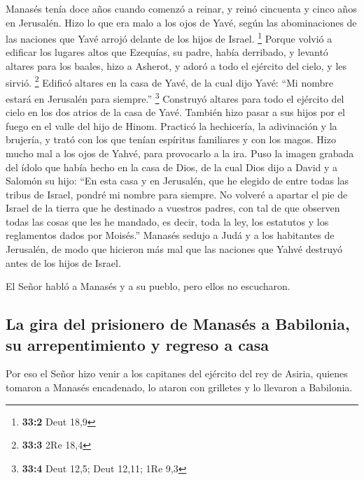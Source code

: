 \begin{paracol}{2}
 Manasés tenía doce años cuando comenzó a reinar, y reinó
cincuenta y cinco años en Jerusalén.  Hizo lo que era malo
a los ojos de Yavé, según las abominaciones de las naciones que Yavé
arrojó delante de los hijos de Israel. \footnote{\textbf{33:2} Deut 18,9}
 Porque volvió a edificar los lugares altos que Ezequías,
su padre, había derribado, y levantó altares para los baales, hizo a
Asherot, y adoró a todo el ejército del cielo, y les sirvió. \footnote{\textbf{33:3}
  2Re 18,4}  Edificó altares en la casa de Yavé, de la
cual dijo Yavé: ``Mi nombre estará en Jerusalén para siempre.''
\footnote{\textbf{33:4} Deut 12,5; Deut 12,11; 1Re 9,3} 
Construyó altares para todo el ejército del cielo en los dos atrios de
la casa de Yavé.  También hizo pasar a sus hijos por el
fuego en el valle del hijo de Hinom. Practicó la hechicería, la
adivinación y la brujería, y trató con los que tenían espíritus
familiares y con los magos. Hizo mucho mal a los ojos de Yahvé, para
provocarlo a la ira.  Puso la imagen grabada del ídolo que
había hecho en la casa de Dios, de la cual Dios dijo a David y a Salomón
su hijo: ``En esta casa y en Jerusalén, que he elegido de entre todas
las tribus de Israel, pondré mi nombre para siempre.  No
volveré a apartar el pie de Israel de la tierra que he destinado a
vuestros padres, con tal de que observen todas las cosas que les he
mandado, es decir, toda la ley, los estatutos y los reglamentos dados
por Moisés.''  Manasés sedujo a Judá y a los habitantes de
Jerusalén, de modo que hicieron más mal que las naciones que Yahvé
destruyó antes de los hijos de Israel.

 El Señor habló a Manasés y a su pueblo, pero ellos no
escucharon.

\hypertarget{la-gira-del-prisionero-de-manasuxe9s-a-babilonia-su-arrepentimiento-y-regreso-a-casa}{%
\subsection{La gira del prisionero de Manasés a Babilonia, su
arrepentimiento y regreso a
casa}\label{la-gira-del-prisionero-de-manasuxe9s-a-babilonia-su-arrepentimiento-y-regreso-a-casa}}

 Por eso el Señor hizo venir a los capitanes del ejército
del rey de Asiria, quienes tomaron a Manasés encadenado, lo ataron con
grilletes y lo llevaron a Babilonia.


\end{paracol}
